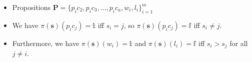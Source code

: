 \documentclass[10pt]{beamer}
\begin{document}
\begin{frame}
\begin{columns}
  \begin{column}{7cm}
    \begin{itemize}[label=$\clubsuit$]
    \item Propositions $\boldsymbol P = \{ p_i c_2, p_i c_3, \ldots, p_i c_a, w_i,l_i \}^m_{i=1}$
    \item We have $\pi(\boldsymbol s)(p_i c_j) = \mathbb{t}$ iff $s_i = j$, so $\pi(\boldsymbol s)(p_ic_j) = \mathbb{f}$ iff $s_i \neq j$.
    \item Furthermore, we have $\pi(\boldsymbol s)(w_i) = \mathbb{t}$ and $\pi(\boldsymbol s)(l_i) =\mathbb{f}$ iff $s_i > s_j$ for all $j \neq i$. 
    \end{itemize}
  \end{column}
 \end{columns}
\end{frame}
\end{document}
